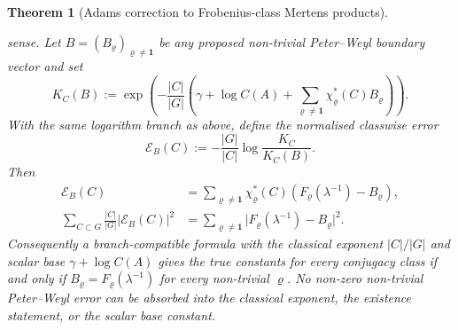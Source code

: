 \documentclass[11pt,a4paper]{amsart}
\theoremstyle{plain}
\newtheorem{theorem}{Theorem}[section]
\theoremstyle{definition}
\theoremstyle{remark}
\newcommand{\abs}[1]{\lvert #1 \rvert}
\begin{document}
\begin{theorem}[Adams correction to Frobenius-class Mertens products]
\begin{enumerate}[label=\textup{(\Alph*)}]
    sense.  Let \(B=(B_\varrho)_{\varrho\ne\mathbf1}\) be any proposed
    non-trivial Peter--Weyl boundary vector and set
    \[
      K_C(B):=
      \exp\!\left(
        -\frac{|C|}{|G|}
        \left(
          \gamma+\log C(A)
          +\sum_{\varrho\neq\mathbf1}
            \chi_\varrho^\ast(C)B_\varrho
        \right)
      \right).
    \]
    With the same logarithm branch as above, define the normalised classwise
    error
    \[
      \mathscr E_B(C):=-\frac{|G|}{|C|}
        \log\frac{K_C}{K_C(B)}.
    \]
    Then
    \begin{equation}\label{eq:comparison-parseval-bound}
      \begin{aligned}
      \mathscr E_B(C)
      &=
      \sum_{\varrho\ne\mathbf1}
        \chi_\varrho^\ast(C)
        \left(F_\varrho(\lambda^{-1})-B_\varrho\right),\\
      \sum_{C\subset G}\frac{|C|}{|G|}\abs{\mathscr E_B(C)}^2
      &=
      \sum_{\varrho\ne\mathbf1}
        \abs{F_\varrho(\lambda^{-1})-B_\varrho}^2 .
      \end{aligned}
    \end{equation}
    Consequently a branch-compatible formula with the classical exponent
    \(|C|/|G|\) and scalar base \(\gamma+\log C(A)\) gives the true constants
    for every conjugacy class if and only if
    \(B_\varrho=F_\varrho(\lambda^{-1})\) for every non-trivial
    \(\varrho\).  No non-zero non-trivial Peter--Weyl error can be absorbed
    into the classical exponent, the existence statement, or the scalar base
    constant.
  \end{enumerate}
\end{theorem}
\end{document}
